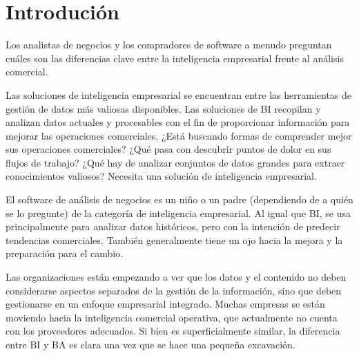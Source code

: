 \section{Introdución} 
\vspace{12mm} %


Los analistas de negocios y los compradores de software a menudo preguntan cuáles son las diferencias clave entre la inteligencia empresarial frente al análisis comercial.

Las soluciones de inteligencia empresarial se encuentran entre las herramientas de gestión de datos más valiosas disponibles. Las soluciones de BI recopilan y analizan datos actuales y procesables con el fin de proporcionar información para mejorar las operaciones comerciales. ¿Está buscando formas de comprender mejor sus operaciones comerciales? ¿Qué pasa con descubrir puntos de dolor en sus flujos de trabajo? ¿Qué hay de analizar conjuntos de datos grandes para extraer conocimientos valiosos? Necesita una solución de inteligencia empresarial.

El software de análisis de negocios es un niño o un padre (dependiendo de a quién se lo pregunte) de la categoría de inteligencia empresarial. Al igual que BI, se usa principalmente para analizar datos históricos, pero con la intención de predecir tendencias comerciales. También generalmente tiene un ojo hacia la mejora y la preparación para el cambio.

Las organizaciones están empezando a ver que los datos y el contenido no deben considerarse aspectos separados de la gestión de la información, sino que deben gestionarse en un enfoque empresarial integrado. Muchas empresas se están moviendo hacia la inteligencia comercial operativa, que actualmente no cuenta con los proveedores adecuados.
Si bien es superficialmente similar, la diferencia entre BI y BA es clara una vez que se hace una pequeña excavación.

		

